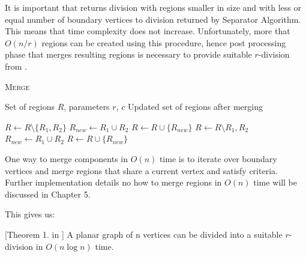It is important that  returns division with regions smaller in size and with less or equal number of boundary vertices to division returned by Separator Algorithm. This means that time complexity does not increase. Unfortunately, more that $O(n/r)$ regions can be created using this procedure, hence post processing phase that merges resulting regions is necessary to provide suitable $r$-division from .

\begin{algorithm}
\caption{\textsc{Merge}}\label{mergeRegions}
\begin{algorithmic}[1]
\Require Set of regions $R$, parameters $r$, $c$
\Ensure Updated set of regions after merging

    \State  $R \gets R \setminus \{R_1,R_2\}$
    \State $R_{new} \gets R_1 \cup R_2$
    \State $R \gets R \cup \{R_{new}\}$
\EndWhile
{}
    \State $R \gets R \setminus {R_1,R_2}$
    \State $R_{new} \gets R_1 \cup R_2$
    \State $R \gets R \cup \{R_{new}\}$
\EndWhile

\State {}
\end{algorithmic}
\end{algorithm}

One way to merge components in $O(n)$ time is to iterate over boundary vertices and merge regions that share a current vertex and satisfy criteria. Further implementation details no how to merge regions in $O(n)$ time will be discussed in Chapter 5.

This gives us:

\begin{theorem}
\label{suitableT}[Theorem 1. in \cite{frederickson}]
A planar graph of n vertices can be divided into a suitable $r$-division in $O(n \log n)$ time.
\end{theorem}

